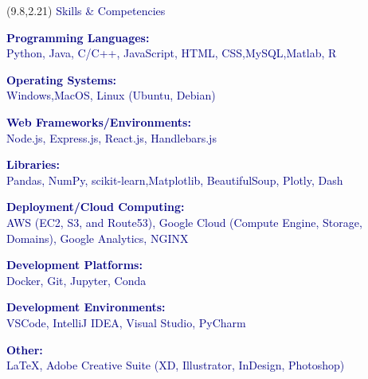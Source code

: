 \documentclass[hidelinks, 10pt]{article}
\newcommand{\bodyspacing}{1mm}
\begin{document}


\begin{textblock}{3.75}(9.8,2.21)
	\setlength{\parindent}{0cm}
    \large{\textcolor{navy}{Skills \& Competencies}}

	\vspace{4mm}

	\textcolor{navy}{\footnotesize\textbf{Programming Languages:}\\
	Python, Java, C/C++, JavaScript, HTML, CSS,MySQL,Matlab, R}

	\vspace{\bodyspacing}

	\textcolor{navy}{\footnotesize\textbf{Operating Systems:}\\
	Windows,MacOS, Linux (Ubuntu, Debian)}

	\vspace{\bodyspacing}

	\textcolor{navy}{\footnotesize\textbf{Web Frameworks/Environments:}\\
	Node.js, Express.js, React.js, Handlebars.js}

	\vspace{\bodyspacing}

	\textcolor{navy}{\footnotesize\textbf{Libraries:}\\
	Pandas, NumPy, scikit-learn,Matplotlib, BeautifulSoup, Plotly, Dash}

	\vspace{\bodyspacing}

	\textcolor{navy}{\footnotesize\textbf{Deployment/Cloud Computing:}\\
	AWS (EC2, S3, and Route53), Google Cloud (Compute Engine, Storage, Domains),
	Google Analytics, NGINX}

	\vspace{\bodyspacing}

	\textcolor{navy}{\footnotesize\textbf{Development Platforms:}\\
	Docker, Git, Jupyter, Conda}

	\vspace{\bodyspacing}

	\textcolor{navy}{\footnotesize\textbf{Development Environments:}\\
	VSCode, IntelliJ IDEA, Visual Studio, PyCharm}

	\vspace{\bodyspacing}

	\textcolor{navy}{\footnotesize\textbf{Other:}\\
	\LaTeX, Adobe Creative Suite (XD, Illustrator, InDesign, Photoshop)}
\end{textblock}
\end{document}
